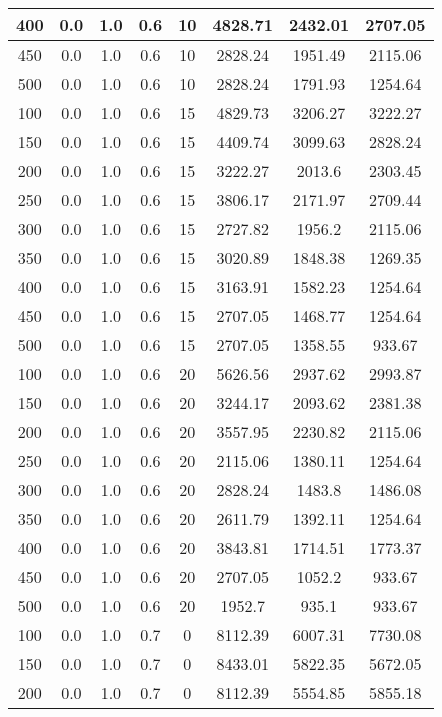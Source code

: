 \documentclass[a4paper, 12pt]{extreport}
\begin{document}
\begin{itemize}
\begin{longtable}{|c|c|c|c|c|c|c|c|}
			400 & 0.0 & 1.0 & 0.6 & 10 & 4828.71 & 2432.01 & 2707.05 \\\hline
			450 & 0.0 & 1.0 & 0.6 & 10 & 2828.24 & 1951.49 & 2115.06 \\\hline
			500 & 0.0 & 1.0 & 0.6 & 10 & 2828.24 & 1791.93 & 1254.64 \\\hline
			100 & 0.0 & 1.0 & 0.6 & 15 & 4829.73 & 3206.27 & 3222.27 \\\hline
			150 & 0.0 & 1.0 & 0.6 & 15 & 4409.74 & 3099.63 & 2828.24 \\\hline
			200 & 0.0 & 1.0 & 0.6 & 15 & 3222.27 & 2013.6 & 2303.45 \\\hline
			250 & 0.0 & 1.0 & 0.6 & 15 & 3806.17 & 2171.97 & 2709.44 \\\hline
			300 & 0.0 & 1.0 & 0.6 & 15 & 2727.82 & 1956.2 & 2115.06 \\\hline
			350 & 0.0 & 1.0 & 0.6 & 15 & 3020.89 & 1848.38 & 1269.35 \\\hline
			400 & 0.0 & 1.0 & 0.6 & 15 & 3163.91 & 1582.23 & 1254.64 \\\hline
			450 & 0.0 & 1.0 & 0.6 & 15 & 2707.05 & 1468.77 & 1254.64 \\\hline
			500 & 0.0 & 1.0 & 0.6 & 15 & 2707.05 & 1358.55 & 933.67 \\\hline
			100 & 0.0 & 1.0 & 0.6 & 20 & 5626.56 & 2937.62 & 2993.87 \\\hline
			150 & 0.0 & 1.0 & 0.6 & 20 & 3244.17 & 2093.62 & 2381.38 \\\hline
			200 & 0.0 & 1.0 & 0.6 & 20 & 3557.95 & 2230.82 & 2115.06 \\\hline
			250 & 0.0 & 1.0 & 0.6 & 20 & 2115.06 & 1380.11 & 1254.64 \\\hline
			300 & 0.0 & 1.0 & 0.6 & 20 & 2828.24 & 1483.8 & 1486.08 \\\hline
			350 & 0.0 & 1.0 & 0.6 & 20 & 2611.79 & 1392.11 & 1254.64 \\\hline
			400 & 0.0 & 1.0 & 0.6 & 20 & 3843.81 & 1714.51 & 1773.37 \\\hline
			450 & 0.0 & 1.0 & 0.6 & 20 & 2707.05 & 1052.2 & 933.67 \\\hline
			500 & 0.0 & 1.0 & 0.6 & 20 & 1952.7 & 935.1 & 933.67 \\\hline
			100 & 0.0 & 1.0 & 0.7 & 0 & 8112.39 & 6007.31 & 7730.08 \\\hline
			150 & 0.0 & 1.0 & 0.7 & 0 & 8433.01 & 5822.35 & 5672.05 \\\hline
			200 & 0.0 & 1.0 & 0.7 & 0 & 8112.39 & 5554.85 & 5855.18 \\\hline

\end{longtable}
\end{itemize}
\end{document}
